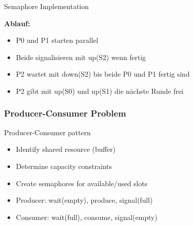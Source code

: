 \begin{example2}{Semaphore Implementation}
\begin{minipage}{0.42\linewidth}
    \textbf{Ablauf:}
    \begin{itemize}
        \item P0 und P1 starten parallel
        \item Beide signalisieren mit up(S2) wenn fertig
        \item P2 wartet mit down(S2) bis beide P0 und P1 fertig sind
        \item P2 gibt mit up(S0) und up(S1) die nächste Runde frei
    \end{itemize}
    \end{minipage}
\end{example2}

\subsubsection{Producer-Consumer Problem}

\begin{KR}{Producer-Consumer pattern}
    \begin{itemize}
        \item Identify shared resource (buffer)
        \item Determine capacity constraints
        \item Create semaphores for available/used slots
        \item Producer: wait(empty), produce, signal(full)
        \item Consumer: wait(full), consume, signal(empty)
    \end{itemize}
\end{KR}


